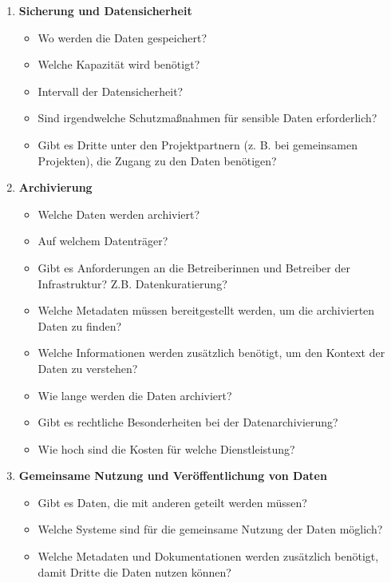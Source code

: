 \begin{enumerate}[start=0, label=\textbf{\arabic*})]
\begin{itemize}
              einem Leitfaden, selbst definiert)?
        \end{itemize}
  \item \textbf{Sicherung und Datensicherheit}
        \begin{itemize}
          \item Wo werden die Daten gespeichert?
          \item Welche Kapazität wird benötigt?
          \item Intervall der Datensicherheit?
          \item Sind irgendwelche Schutzmaßnahmen für sensible Daten erforderlich?
          \item Gibt es Dritte unter den Projektpartnern (z. B. bei gemeinsamen
                Projekten), die Zugang zu den Daten benötigen?
        \end{itemize}
  \item \textbf{Archivierung}
        \begin{itemize}
          \item Welche Daten werden archiviert?
          \item Auf welchem Datenträger?
          \item Gibt es Anforderungen an die Betreiberinnen und Betreiber der Infrastruktur? Z.B.
                Datenkuratierung?
          \item Welche Metadaten müssen bereitgestellt werden, um die
                archivierten Daten zu finden?
          \item Welche Informationen werden zusätzlich benötigt, um den
                Kontext der Daten zu verstehen?
          \item Wie lange werden die Daten archiviert?
          \item Gibt es rechtliche Besonderheiten bei der Datenarchivierung?
          \item Wie hoch sind die Kosten für welche Dienstleistung?
        \end{itemize}
  \item \textbf{Gemeinsame Nutzung und Veröffentlichung von Daten}
        \begin{itemize}
          \item Gibt es Daten, die mit anderen geteilt werden müssen?
          \item Welche Systeme sind für die gemeinsame Nutzung der Daten möglich?
          \item Welche Metadaten und Dokumentationen werden zusätzlich benötigt,
                damit Dritte die Daten nutzen können?

\end{itemize}
\end{enumerate}
